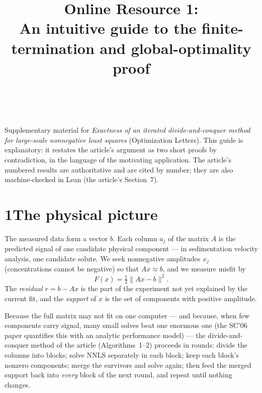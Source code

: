 \documentclass[pdflatex,sn-mathphys-num]{sn-jnl}
\begin{document}
\title[Online Resource 1]{Online Resource 1:\\ An intuitive guide to
the finite-termination and global-optimality proof}

\author*[1]{
\,}%


\maketitle

\noindent
Supplementary material for \emph{Exactness of an iterated
divide-and-conquer method for large-scale nonnegative least squares}
(Optimization Letters). This guide is explanatory: it restates the
article's argument as two short proofs by contradiction, in the
language of the motivating application. The article's numbered results
are authoritative and are cited by number; they are also
machine-checked in Lean (the article's Section~7).

\section*{1\quad The physical picture}

The measured data form a vector $b$. Each column $a_j$ of the matrix
$A$ is the predicted signal of one candidate physical component ---
in sedimentation velocity analysis, one candidate solute. We seek
nonnegative amplitudes $x_j$ (concentrations cannot be negative) so
that $Ax\approx b$, and we measure misfit by
\begin{equation*}
F(x)=\tfrac12\lVert Ax-b\rVert^2 .
\end{equation*}
The \emph{residual} $r=b-Ax$ is the part of the experiment not yet
explained by the current fit, and the \emph{support} of $x$ is the set
of components with positive amplitude.

Because the full matrix may not fit on one computer --- and because,
when few components carry signal, many small solves beat one enormous
one (the SC'06 paper quantifies this with an analytic performance
model) --- the divide-and-conquer method of the article
(Algorithms~1--2) proceeds in rounds: divide the columns into blocks; solve NNLS separately in each
block; keep each block's nonzero components; merge the survivors and
solve again; then feed the merged support back into \emph{every} block
of the next round, and repeat until nothing changes.
\end{document}
